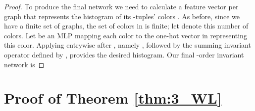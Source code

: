 \documentclass{article}
\begin{document}
\begin{proof}
To produce the final network we need to calculate a feature vector per graph that represents the histogram of its -tuples' colors . As before, since we have a finite set of graphs, the set of colors in  is finite; let  denote this number of colors. Let  be an MLP mapping each color  to the one-hot vector in  representing this color. Applying  entrywise after , namely , followed by the summing invariant operator  defined by ,  provides the desired histogram. Our final -order invariant network is 



\end{proof}

\section{Proof of Theorem \ref{thm:3_WL}}\label{app:thm2}
\end{document}
